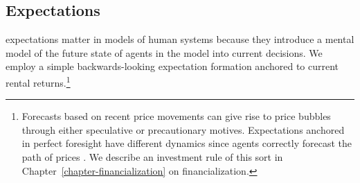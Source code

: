 \subsection{Expectations}
\Glspl{expectation} matter in models of human systems because they introduce a mental model of the future state of agents in the model into current decisions.  We employ a simple backwards-looking expectation formation anchored 
to current rental returns.\footnote{Forecasts based on recent price movements can give rise to \glspl{price bubble} through either speculative or precautionary motives. Expectations anchored in \gls{perfect foresight} have different dynamics since agents correctly forecast the path of prices \cite{muthRationalExpectationsTheory1961}.  We describe an investment rule of this sort in Chapter~\ref{chapter-financialization} on financialization.} 










